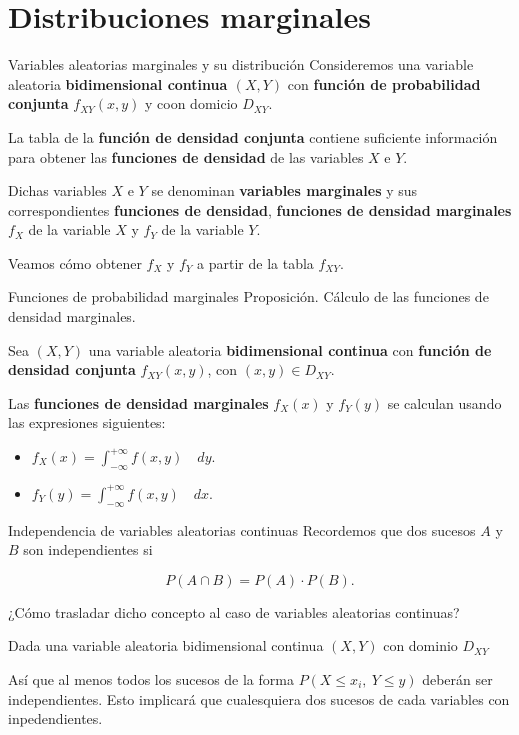 \documentclass[
  ignorenonframetext,
]{beamer}
\begin{document}
\hypertarget{distribuciones-marginales}{%
\section{Distribuciones marginales}\label{distribuciones-marginales}}

\begin{frame}{Variables aleatorias marginales y su distribución}
\protect\hypertarget{variables-aleatorias-marginales-y-su-distribuciuxf3n}{}
Consideremos una variable aleatoria \textbf{bidimensional continua
\((X,Y)\)} con \textbf{función de probabilidad conjunta} \(f_{XY}(x,y)\)
y coon domicio \(D_{XY}\).

La tabla de la \textbf{función de densidad conjunta} contiene suficiente
información para obtener las \textbf{funciones de densidad} de las
variables \(X\) e \(Y\).

Dichas variables \(X\) e \(Y\) se denominan \textbf{variables
marginales} y sus correspondientes \textbf{funciones de densidad},
\textbf{funciones de densidad marginales} \(f_X\) de la variable \(X\) y
\(f_Y\) de la variable \(Y\).

Veamos cómo obtener \(f_X\) y \(f_Y\) a partir de la tabla \(f_{XY}\).
\end{frame}

\begin{frame}{Funciones de probabilidad marginales}
\protect\hypertarget{funciones-de-probabilidad-marginales}{}
Proposición. Cálculo de las funciones de densidad marginales.

Sea \((X,Y)\) una variable aleatoria \textbf{bidimensional continua} con
\textbf{función de densidad conjunta} \(f_{XY}(x,y)\), con
\((x,y)\in D_{XY}\).

Las \textbf{funciones de densidad marginales} \(f_X(x)\) y \(f_Y(y)\) se
calculan usando las expresiones siguientes:

\begin{itemize}
\item
  \(f_X(x)= \displaystyle \int_{-\infty}^{+\infty} f(x,y)\quad dy.\)
\item
  \(f_Y(y)= \displaystyle \int_{-\infty}^{+\infty} f(x,y)\quad dx.\)
\end{itemize}
\end{frame}

\begin{frame}{Independencia de variables aleatorias continuas}
\protect\hypertarget{independencia-de-variables-aleatorias-continuas}{}
Recordemos que dos sucesos \(A\) y \(B\) son independientes si

\[P(A\cap B)=P(A)\cdot P(B).\]

¿Cómo trasladar dicho concepto al caso de variables aleatorias
continuas?

Dada una variable aleatoria bidimensional continua \((X,Y)\) con dominio
\(D_{XY}\)

Así que al menos todos los sucesos de la forma
\(P\left(X\leq x_i,\  Y\leq y\right)\) deberán ser independientes. Esto
implicará que cualesquiera dos sucesos de cada variables con
inpedendientes.
\end{frame}
\end{document}
